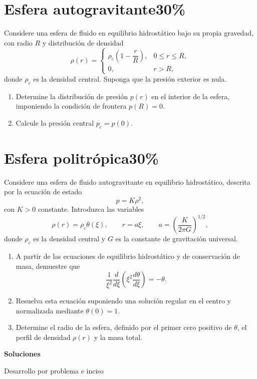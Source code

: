 \documentclass[11pt,a4paper]{article}
\begin{document}
\clearpage

\section{Esfera autogravitante\hfill 30\%}

Considere una esfera de fluido en equilibrio hidrostático bajo su propia gravedad, con radio $R$ y distribución de densidad
\[
\rho(r) =
\begin{cases}
    \rho_c\left(1 - \dfrac{r}{R}\right), & 0 \le r \le R,\\
    0, & r > R,
\end{cases}
\]
donde $\rho_c$ es la densidad central. Suponga que la presión exterior es nula.
\begin{enumerate}[label=\alph*), leftmargin=*]
    \item Determine la distribución de presión $p(r)$ en el interior de la esfera, imponiendo la condición de frontera $p(R) = 0$.
    \item Calcule la presión central $p_c = p(0)$.
\end{enumerate}

\section{Esfera politrópica\hfill 30\%}

Considere una esfera de fluido autogravitante en equilibrio hidrostático, descrita por la ecuación de estado
\[
p = K\rho^2,
\]
con $K > 0$ constante. Introduzca las variables
\[
\rho(r) = \rho_c\theta(\xi),
\qquad r = a\xi,
\qquad a = \left(\frac{K}{2\pi G}\right)^{1/2},
\]
donde $\rho_c$ es la densidad central y $G$ es la constante de gravitación universal.
\begin{enumerate}[label=\alph*), leftmargin=*]
    \item A partir de las ecuaciones de equilibrio hidrostático y de conservación de masa, demuestre que
    \[
    \frac{1}{\xi^2}\frac{d}{d\xi}
    \left(\xi^2\frac{d\theta}{d\xi}\right) = -\theta.
    \]
    \item Resuelva esta ecuación suponiendo una solución regular en el centro y normalizada mediante $\theta(0) = 1$.
    \item Determine el radio de la esfera, definido por el primer cero positivo de $\theta$, el perfil de densidad $\rho(r)$ y la masa total.
\end{enumerate}

\clearpage
\setcounter{section}{0}
\begin{center}
    {\LARGE\bfseries Soluciones\par}
    \vspace{3pt}
    {\small Desarrollo por problema e inciso\par}
\end{center}
\end{document}
